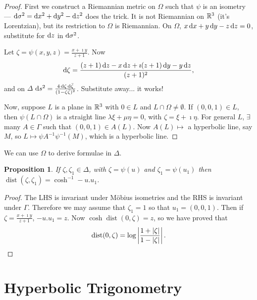 \documentclass{notes}
\theoremstyle{plain}
\newtheorem{proposition}{Proposition}[chapter]
\DeclareMathOperator{\dist}{dist}
\begin{document}
\begin{proof}
First we construct a Riemannian metric on $\Omega$ such that $\psi$ is an
isometry --- $\mathrm{d}\sigma^2 = \mathrm{d} x^2 + \mathrm{d} y^2 - \mathrm{d} z^2$ does the trick.  It is not
Riemannian on $\mathbb{R}^3$ (it's Lorentzian), but its restriction to $\Omega$ is
Riemannian.  On $\Omega$, $x\, \mathrm{d} x + y\, \mathrm{d} y - z\, \mathrm{d} z = 0$, substitute
for $\mathrm{d} z$ in $\mathrm{d}\sigma^2$.

Let $\zeta = \psi(x,y,z) = \frac{x + \imath y}{z+1}$.  Now
\[
\mathrm{d}\zeta = \frac{(z+1)\, \mathrm{d} z - x\, \mathrm{d} z + \imath (z+1)\, \mathrm{d} y -
  y\, \mathrm{d} z}{(z+1)^2},
\]
and on $\Delta$ $\mathrm{d} s^2 = \frac{4\, \mathrm{d}\zeta\, \mathrm{d}\Bar{\zeta}}{(1-\zeta \Bar{\zeta})
^2}$.  Substitute away... it works!

Now, suppose $L$ is a plane in $\mathbb{R}^3$ with $0 \in L$ and $L \cap \Omega \neq
\emptyset$.  If $(0,0,1) \in L$, then $\psi(L \cap \Omega)$ is a straight line
$\lambda \xi + \mu \eta = 0$, with $\zeta = \xi + \imath \eta$.  For general
$L$, $\exists\ $ many $A \in \Gamma$ such that $(0,0,1) \in A(L)$. Now
$A(L) \mapsto$ a hyperbolic line, say $M$, so $L \mapsto \psi A^{-1}
\psi^{-1} (M)$, which is a hyperbolic line.
\end{proof}

We can use $\Omega$ to derive formulae in $\Delta$.

\begin{proposition}
If $\zeta, \zeta_1 \in \Delta$, with $\zeta = \psi(u)$ and $\zeta_1 =
\psi(u_1)$ then $\dist(\zeta,\zeta_1) = \cosh^{-1} - u.u_1$.
\end{proposition}

\begin{proof}
The LHS is invariant under M\"obius isometries and the RHS is invariant
under $\Gamma$.  Therefore we may assume that $\zeta_1 = 1$ so that
$u_1 = (0,0,1)$.  Then if $\zeta = \frac{x + \imath y}{z+1}$, $-u.u_1
= z$.  Now $\cosh \dist(0,\zeta) = z$, so we have proved that
\[
\dist(0,\zeta) = \log \abs{ \frac{1+\abs{\zeta}}{1-\abs{\zeta}} }.
\]
\end{proof}

\section{Hyperbolic Trigonometry}
\end{document}
